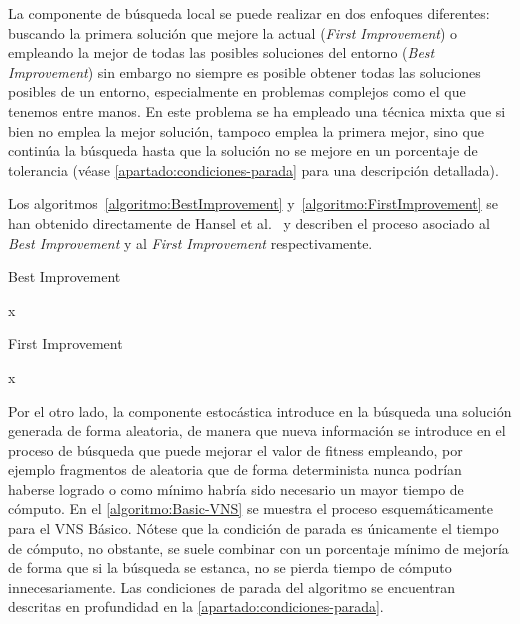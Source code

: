 La componente de búsqueda local se puede realizar en dos enfoques diferentes: buscando la primera solución que mejore la actual (\textit{First Improvement}) o empleando la mejor de todas las posibles soluciones del entorno (\textit{Best Improvement}) sin embargo no siempre es posible obtener todas las soluciones posibles de un entorno, especialmente en problemas complejos como el que tenemos entre manos. En este problema se ha empleado una técnica mixta que si bien no emplea la mejor solución, tampoco emplea la primera mejor, sino que continúa la búsqueda hasta que la solución no se mejore en un porcentaje de tolerancia (véase \autoref{apartado:condiciones-parada} para una descripción detallada).

Los algoritmos~\ref{algoritmo:BestImprovement} y~\ref{algoritmo:FirstImprovement} se han obtenido directamente de Hansel et al.~\cite{vns} y describen el proceso asociado al \textit{Best Improvement} y al \textit{First Improvement} respectivamente.

\begin{algorithm}[htbp]
    \caption{Best Improvement}
    \label{algoritmo:BestImprovement}

    \DontPrintSemicolon
    \medskip

    \Return x \;

\end{algorithm}

\begin{algorithm}[htbp]
    \caption{First Improvement}
    \label{algoritmo:FirstImprovement}

    \DontPrintSemicolon
    \medskip

    \Return x \;

\end{algorithm}

Por el otro lado, la componente estocástica introduce en la búsqueda una solución generada de forma aleatoria, de manera que nueva información se introduce en el proceso de búsqueda que puede mejorar el valor de fitness empleando, por ejemplo fragmentos de aleatoria que de forma determinista nunca podrían haberse logrado o como mínimo habría sido necesario un mayor tiempo de cómputo. En el \autoref{algoritmo:Basic-VNS} se muestra el proceso esquemáticamente para el VNS Básico. Nótese que la condición de parada es únicamente el tiempo de cómputo, no obstante, se suele combinar con un porcentaje mínimo de mejoría de forma que si la búsqueda se estanca, no se pierda tiempo de cómputo innecesariamente. Las condiciones de parada del algoritmo se encuentran descritas en profundidad en la \autoref{apartado:condiciones-parada}.

